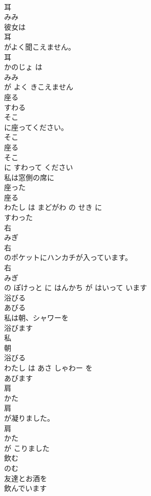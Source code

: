\documentclass[8pt]{extreport}
\begin{document}
\begin{CJK}{UTF8}{min}
\\	耳	
\\	みみ	
\\	彼女は
\\	耳
\\	がよく聞こえません。	
\\	耳 
\\	かのじょ は 
\\	みみ
\\	が よく きこえません	
\\	座る	
\\	すわる	
\\	そこ
\\	に座ってください。	
\\	そこ 
\\	座る 
\\	そこ
\\	に すわって ください	
\\	私は窓側の席に
\\	座った
\\	座る 
\\	わたし は まどがわ の せき に 
\\	すわった
\\	右	
\\	みぎ	
\\	右
\\	のポケットにハンカチが入っています。	
\\	右 
\\	みぎ
\\	の ぽけっと に はんかち が はいって います	
\\	浴びる	
\\	あびる	
\\	私は朝、シャワーを
\\	浴びます
\\	私 
\\	朝 
\\	浴びる 
\\	わたし は あさ しゃわー を 
\\	あびます
\\	肩	
\\	かた	
\\	肩
\\	が凝りました。	
\\	肩 
\\	かた
\\	が こりました	
\\	飲む	
\\	のむ	
\\	友達とお酒を
\\	飲んでいます

\end{CJK}
\end{document}
